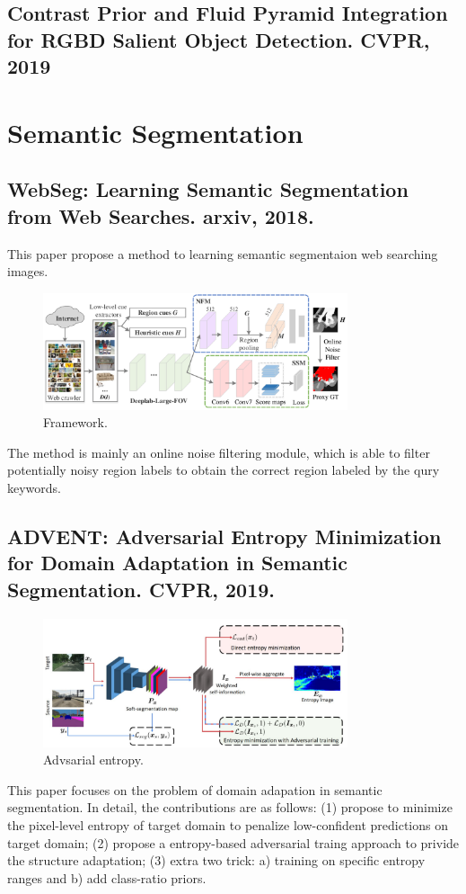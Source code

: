 \documentclass[10pt,onecolumn]{book}
\begin{document}
\section{Contrast Prior and Fluid Pyramid Integration for RGBD Salient Object Detection. CVPR, 2019}

\chapter{Semantic Segmentation}
\section{WebSeg: Learning Semantic Segmentation from Web Searches. arxiv, 2018.}
This paper propose a method to learning semantic segmentaion web searching images.
\begin{figure}[h]
\centering
\includegraphics[width=0.8\textwidth]{figures_paper_reading/webseg.png}
\caption{Framework.}
\label{fig}
\end{figure}
The method is mainly an online noise filtering module, which is able to filter potentially noisy region labels to obtain the correct region labeled by the qury keywords.

\section{ADVENT: Adversarial Entropy Minimization for Domain Adaptation in Semantic Segmentation. CVPR, 2019.}
\begin{figure}[h]
\centering
\includegraphics[width=0.8\textwidth]{figures_paper_reading/ADVENT_Adversarial_Entropy_Minimization_for_Domain_Adaptation_in_Semantic_Segmentation_CVPR2019.png}
\caption{Advsarial entropy.}
\label{fig}
\end{figure}
This paper focuses on the problem of domain adapation in semantic segmentation. In detail, the contributions are as follows: (1) propose to minimize the pixel-level entropy of target domain to penalize low-confident predictions on target domain; (2) propose a entropy-based adversarial traing approach to privide the structure adaptation; (3) extra two trick: a) training on specific entropy ranges and b) add class-ratio priors.
\end{document}
